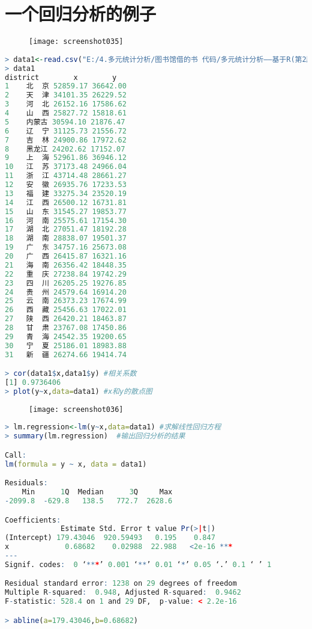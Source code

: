 \documentclass[11pt,a4paper,oneside]{book}
\begin{document}
\section{一个回归分析的例子}
\begin{figure}[H]
	\centering
	\texttt{[image: screenshot035]}
\end{figure}
\begin{lstlisting}[language=r]
> data1<-read.csv("E:/4.多元统计分析/图书馆借的书 代码/多元统计分析——基于R(第2版) R-data/eg1.1.csv",header=TRUE)
> data1
district        x        y
1    北  京 52859.17 36642.00
2    天  津 34101.35 26229.52
3    河  北 26152.16 17586.62
4    山  西 25827.72 15818.61
5    内蒙古 30594.10 21876.47
6    辽  宁 31125.73 21556.72
7    吉  林 24900.86 17972.62
8    黑龙江 24202.62 17152.07
9    上  海 52961.86 36946.12
10   江  苏 37173.48 24966.04
11   浙  江 43714.48 28661.27
12   安  徽 26935.76 17233.53
13   福  建 33275.34 23520.19
14   江  西 26500.12 16731.81
15   山  东 31545.27 19853.77
16   河  南 25575.61 17154.30
17   湖  北 27051.47 18192.28
18   湖  南 28838.07 19501.37
19   广  东 34757.16 25673.08
20   广  西 26415.87 16321.16
21   海  南 26356.42 18448.35
22   重  庆 27238.84 19742.29
23   四  川 26205.25 19276.85
24   贵  州 24579.64 16914.20
25   云  南 26373.23 17674.99
26   西  藏 25456.63 17022.01
27   陕  西 26420.21 18463.87
28   甘  肃 23767.08 17450.86
29   青  海 24542.35 19200.65
30   宁  夏 25186.01 18983.88
31   新  疆 26274.66 19414.74

> cor(data1$x,data1$y) #相关系数
[1] 0.9736406
> plot(y~x,data=data1) #x和y的散点图
\end{lstlisting}
\begin{figure}[H]
	\centering
	\texttt{[image: screenshot036]}
\end{figure}
\begin{lstlisting}[language=r]
> lm.regression<-lm(y~x,data=data1) #求解线性回归方程
> summary(lm.regression)  #输出回归分析的结果

Call:
lm(formula = y ~ x, data = data1)

Residuals:
    Min      1Q  Median      3Q     Max 
-2099.8  -629.8   138.5   772.7  2628.6 

Coefficients:
             Estimate Std. Error t value Pr(>|t|)    
(Intercept) 179.43046  920.59493   0.195    0.847    
x             0.68682    0.02988  22.988   <2e-16 ***
---
Signif. codes:  0 ‘***’ 0.001 ‘**’ 0.01 ‘*’ 0.05 ‘.’ 0.1 ‘ ’ 1

Residual standard error: 1238 on 29 degrees of freedom
Multiple R-squared:  0.948,	Adjusted R-squared:  0.9462 
F-statistic: 528.4 on 1 and 29 DF,  p-value: < 2.2e-16

> abline(a=179.43046,b=0.68682)
\end{lstlisting}
\end{document}
